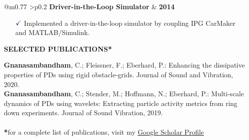 \documentclass[a4paper,10pt]{article}
\begin{document}
\vspace{0.3cm}
\noindent
\begin{tabular}{ @{\hskip 0pt}m{0.77\textwidth} >{\raggedleft\arraybackslash}p{0.2\textwidth} }
    \noindent\textbf{Driver-in-the-Loop Simulator} & \textbf{2014}
\end{tabular}

{\small
\begin{itemize}
    \item[$\textcolor{highlightcolor}{\checkmark}$]  
    Implemented a driver-in-the-loop simulator by coupling IPG CarMaker and MATLAB/Simulink.
\end{itemize}
}

\noindent{\rule{\linewidth}{1.4pt}}
\textbf{SELECTED PUBLICATIONS*}

\vspace{-0.1cm}
\noindent{\rule{\linewidth}{0.01cm}}

{\small 
    \noindent \textbf{Gnanasambandham}, C.; Fleissner, F.; Eberhard, P.: Enhancing the dissipative properties of PDs using rigid obstacle-grids. Journal of Sound and Vibration, 2020.\\
    \noindent \textbf{Gnanasambandham}, C.; Stender, M.; Hoffmann, N.; Eberhard, P.: Multi-scale dynamics of PDs using wavelets: Extracting particle activity metrics from ring down experiments. Journal of Sound Vibration, 2019.\\ \\
    \noindent \textbf{*}for a complete list of publications, visit my \href{https://scholar.google.com/citations?user=azp3ffYAAAAJ&hl=de}{\textcolor{highlightcolor}{\underline{Google Scholar Profile}}} 
}
\end{document}
